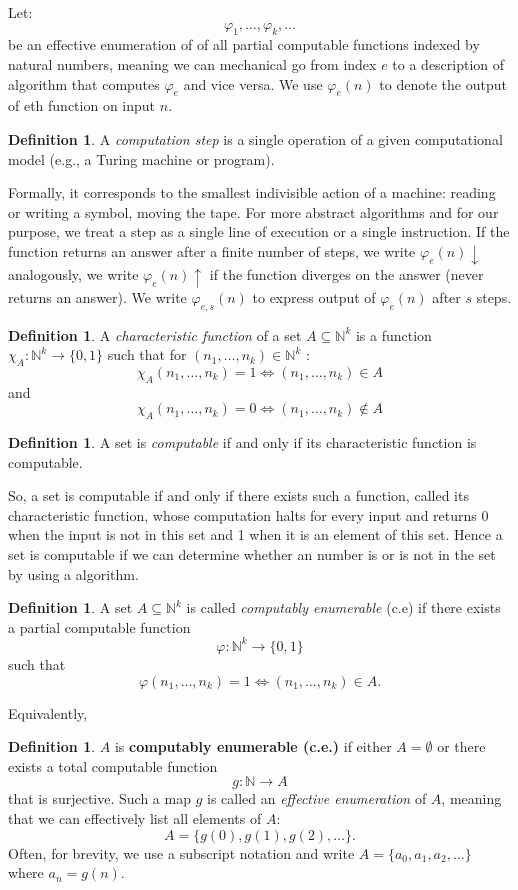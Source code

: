 \documentclass{pracalicmgr2025}
\theoremstyle{plain}            %
\theoremstyle{remark}           %
\theoremstyle{definition}       %
\newtheorem{definition}[theorem]{Definition}
\begin{document}
Let:
$$\varphi_1, \dots, \varphi_k, \dots$$
be an effective enumeration of of all partial computable functions indexed by natural numbers, meaning we can mechanical go from index $e$ to a description of algorithm that computes $\varphi_e$ and vice versa. We use $\varphi_e(n)$ to denote the output of eth function on input $n$. 
\begin{definition}
    A \emph{computation step} is a single operation of a given computational model (e.g., a Turing machine or program).
\end{definition}
Formally, it corresponds to the smallest indivisible action of a machine: reading or writing a symbol, moving the tape. For more abstract algorithms and for our purpose, we treat a step as a single line of execution or a single instruction. If the function returns an answer after a finite number of steps, we write  $\varphi_e(n)\downarrow$ analogously, we write $\varphi_e(n)\uparrow$ if the function diverges on the answer (never returns an answer).  We write $\varphi_{e,s}(n)$ to express output of $\varphi_e(n)$ after $s$ steps. 

\begin{definition} \label{Def 2.1}
A \textit{characteristic function} of a set $A \subseteq \mathbb{N}^k$ is a function $\chi_A:\mathbb{N}^k\to \{0,1\}$ such that for $(n_1, \dots, n_k) \in \mathbb{N}^k$  :
$$
\chi_A(n_1, \dots, n_k) = 1 \iff (n_1, \dots, n_k) \in A
$$
and
$$
\chi_A(n_1, \dots, n_k) = 0 \iff (n_1, \dots, n_k) \notin A
$$
\end{definition}

\begin{definition} \label{Computable set}
A set is \textit{computable} if and only if its characteristic function is computable. 
\end{definition}

So, a set is computable if and only if there exists such a function, called its characteristic function, whose computation halts for every input and returns 0 when the input is not in this set and 1 when it is an element of this set. Hence a set is computable if we can determine whether an number is or is not in the set by using a algorithm. 



\begin{definition} \label{c.e 1}
A set $A \subseteq \mathbb{N}^k$ is called \textit{computably enumerable} (c.e)  if there exists a partial computable function 
$$
\varphi:\mathbb{N}^k \to \{0,1\}
$$ 
such that 
$$
\varphi(n_1,\dots,n_k)=1 \iff (n_1,\dots,n_k)\in A.
$$
\end{definition}
Equivalently,
\begin{definition} \label{c.e 2}
$A$ is  \textbf{computably enumerable (c.e.)} if either $A = \emptyset$ or there exists a total computable function 
$$
g:\mathbb{N}\to A
$$ 
that is surjective. Such a map $g$ is called an \emph{effective enumeration} of $A$, meaning that we can effectively list all elements of $A$:
$$
A = \{ g(0), g(1), g(2), \dots \}.
$$ 
Often, for brevity, we use a subscript notation and write $A = \{a_0, a_1, a_2, \dots\}$ where $a_n = g(n)$.
\end{definition}
\end{document}
